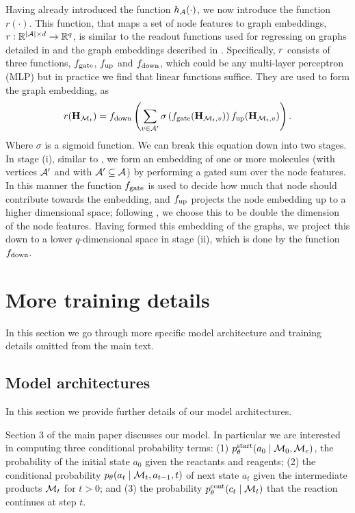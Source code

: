 Having already introduced the function $h_{{\mathcal{A}}}(\cdot)$, we now introduce the function $r(\cdot)$.
This function, that maps a set of node features to  graph embeddings, $r: \mathbb{R}^{|{\mathcal{A}}|\times d} \to \mathbb{R}^{q}$, is similar to the readout functions used for regressing on graphs detailed in \citep[Eq. 3]{gilmer2017neural} and the graph embeddings described in \citet[\S B.1]{li2018learning}. 
Specifically, $r$ consists of three functions, $f_\textrm{gate}$, $f_\textrm{up}$ and $f_\textrm{down}$, which could be any multi-layer perceptron (MLP) but in practice we find that linear functions suffice.
They are used to form the graph embedding, as
\begin{align}
	r({\mathbf{H}}_{{\mathcal{M}}_t}) = f_\textrm{down}\left(\sum_{v \in {\mathcal{A}}'} \sigma\left(f_\textrm{gate}({\mathbf{H}}_{{\mathcal{M}}_t,v})\right) f_\textrm{up}({\mathbf{H}}_{{\mathcal{M}}_t, v})\right).
	\label{eq:graph-embedding}
\end{align}
Where $\sigma$ is a sigmoid function.
We can break this equation down into two stages.
In stage (i), similar to \citet[\S B.1]{li2018learning}, we form an embedding of one or more molecules (with vertices ${\mathcal{A}}'$ and with ${\mathcal{A}}' \subseteq  {\mathcal{A}}$) by performing a gated sum over the node features. 
In this manner the function $f_\textrm{gate}$ is used to decide how much that node should contribute towards the embedding,
 and $f_\textrm{up}$ projects the node embedding up to a higher dimensional space; following \citet[\S B.1]{li2018learning}, we choose this to be double the dimension of the node features.
Having formed this embedding of the graphs, we project this down to a lower $q$-dimensional space in stage (ii), which is done by the function $f_\textrm{down}$. 







\section{More training details}

In this section we go through more specific model architecture and training details omitted from the main text. 

\subsection{Model architectures}
In this section we provide further details of our model architectures.

Section 3 of the main paper discusses our model.
In particular we are interested in computing three conditional probability terms: (1) $p_\theta^{\mathrm{start}}(a_0 \mid {\mathcal{M}}_0, {\mathcal{M}}_e)$, the probability of the initial state $a_0$ given the reactants and reagents; 
(2) the conditional probability $p_\theta(a_t \mid {\mathcal{M}}_t, a_{t-1}, t)$  
of next state $a_t$ given the intermediate products ${\mathcal{M}}_t$ for $t > 0$;
and (3) the probability $p_\theta^{\mathrm{cont}}(c_{t} \mid {\mathcal{M}}_{t})$ that the reaction continues at step $t$.

